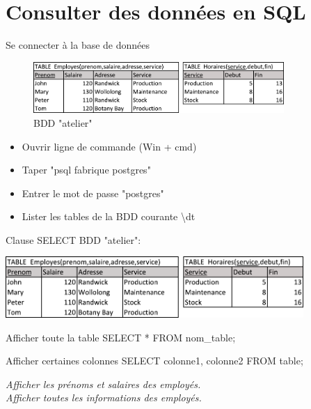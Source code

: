 \documentclass[xetex,dvipsnames]{beamer}
\begin{document}
\section{Consulter des données en SQL}
\begin{frame}{Se connecter à la base de données}
 	\begin{center}
	    	\begin{figure}
	    	\includegraphics[width=0.85\textwidth]{./figures/BDDatelier.pdf}
	    	\caption{BDD "atelier"}
	    	\end{figure}
	\end{center}
	\begin{itemize}
		\item Ouvrir ligne de commande (Win + cmd)
		\item Taper "psql fabrique postgres"
		\item Entrer le mot de passe "postgres"
		\item Lister les tables de la BDD courante \textbackslash dt
	\end{itemize}		
\end{frame}

\begin{frame}{Clause SELECT}
	BDD "atelier":
 	\begin{center}
	    	\includegraphics[width=0.85\textwidth]{./figures/BDDatelier.pdf}
	\end{center}
	\begin{alertblock}{Afficher toute la table}
		SELECT * FROM nom\_table;
	\end{alertblock}
	\begin{alertblock}{Afficher certaines colonnes}
		SELECT colonne1, colonne2 FROM table;
	\end{alertblock}
		\textit{Afficher les prénoms et salaires des employés.}\\
		\textit{Afficher toutes les informations des employés.}
\end{frame}
\end{document}
